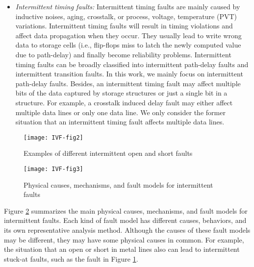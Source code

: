 \begin{itemize}
    \item \textit{Intermittent timing faults:} Intermittent timing faults are mainly caused by inductive noises, aging, crosstalk, or process, voltage, temperature (PVT) variations. Intermittent timing faults will result in timing violations and affect data propagation when they occur. They usually lead to write wrong data to storage cells (i.e., flip-flops miss to latch the newly computed value due to path-delay) and finally become reliability problems. Intermittent timing faults can be broadly classified into intermittent path-delay faults and intermittent transition faults. In this work, we  mainly focus on intermittent path-delay faults. Besides, an intermittent timing fault may affect multiple bits of the data captured by storage structures or just a single bit in a structure. For example, a crosstalk induced delay fault may either affect multiple data lines or only one data line. We only consider the former situation that an intermittent timing fault affects multiple data lines.
\end{itemize}

\begin{figure}[t]
\centering
\texttt{[image: IVF-fig2]}
\caption{Examples of different intermittent open and short faults}
\label{fig:open-short-faults} 
\end{figure}

\begin{figure}[t]
\centering
\texttt{[image: IVF-fig3]}
\caption{Physical causes, mechanisms, and fault models for intermittent faults}
\label{fig:fault-cause} 
\end{figure}


Figure \ref{fig:fault-cause} summarizes the main physical causes, mechanisms, and fault models for intermittent faults. Each kind of fault model has different causes, behaviors, and its own representative analysis method. Although the causes of these fault models may be different, they may have some physical causes in common. For example, the situation that an open or short in metal lines also can lead to intermittent stuck-at faults, such as the fault in Figure \ref{fig:open-short-faults}.

